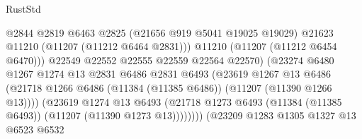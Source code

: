 \begin{lexlean}{RustStd}
\begin{coremodule}
                                              @2844
                                              @2819
                                              @6463
                                              @2825
                                              (@21656 @919 @5041 @19025 @19029)
                                              @21623
                                              @11210
                                              (@11207 (@11212 @6464 @2831)))
                                            @11210
                                            (@11207 (@11212 @6454 @6470)))
                                          @22549
                                          @22552
                                          @22555
                                          @22559
                                          @22564
                                          @22570)
                                        (@23274
                                          @6480
                                          @1267
                                          @1274
                                          @13
                                          @2831
                                          @6486
                                          @2831
                                          @6493
                                          (@23619
                                            @1267
                                            @13
                                            @6486
                                            (@21718
                                              @1266
                                              @6486
                                              (@11384 (@11385 @6486))
                                              (@11207 (@11390 @1266 @13))))
                                          (@23619
                                            @1274
                                            @13
                                            @6493
                                            (@21718
                                              @1273
                                              @6493
                                              (@11384 (@11385 @6493))
                                              (@11207 (@11390 @1273 @13))))))))
                                  (@23209
                                    @1283
                                    @1305
                                    @1327
                                    @13
                                    @6523
                                    @6532

\end{coremodule}
\end{lexlean}
